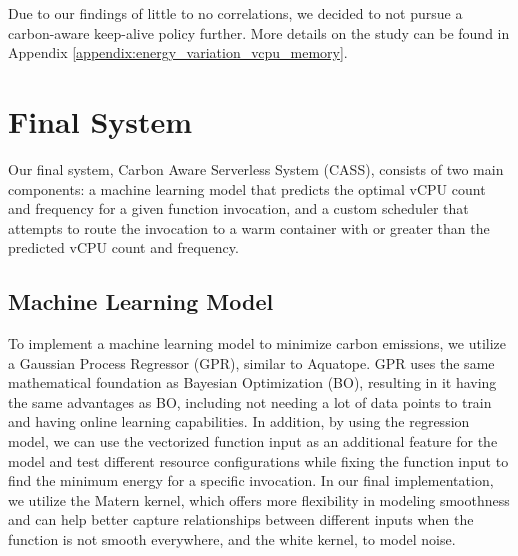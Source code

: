 \documentclass[times, 10pt,twocolumn]{article}
\begin{document}
Due to our findings of little to no correlations, we decided to not pursue a carbon-aware keep-alive policy further. More details on the study can be found in Appendix \ref{appendix:energy_variation_vcpu_memory}.







\section{Final System}

Our final system, Carbon Aware Serverless System (CASS), consists of two main components: a machine learning model that predicts the optimal vCPU count and frequency for a given function invocation, and a custom scheduler that attempts to route the invocation to a warm container with or greater than the predicted vCPU count and frequency.

\subsection{Machine Learning Model}
To implement a machine learning model to minimize carbon emissions, we utilize a Gaussian Process Regressor (GPR), similar to Aquatope\cite{aquatope}. GPR uses the same mathematical foundation as Bayesian Optimization (BO), resulting in it having the same advantages as BO, including not needing a lot of data points to train and having online learning capabilities. In addition, by using the regression model, we can use the vectorized function input as an additional feature for the model and test different resource configurations while fixing the function input to find the minimum energy for a specific invocation. In our final implementation, we utilize the Matern kernel, which offers more flexibility in modeling smoothness and can help better capture relationships between different inputs when the function is not smooth everywhere, and the white kernel, to model noise. 
\end{document}
